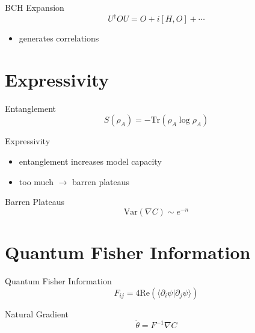 \documentclass{beamer}
\begin{document}

\begin{frame}{BCH Expansion}
\[
U^\dagger O U = O + i[H,O] + \cdots
\]

\begin{itemize}
\item generates correlations
\end{itemize}
\end{frame}

\section{Expressivity}

\begin{frame}{Entanglement}
\[
S(\rho_A) = -\mathrm{Tr}(\rho_A \log \rho_A)
\]
\end{frame}


\begin{frame}{Expressivity}
\begin{itemize}
\item entanglement increases model capacity
\item too much $\rightarrow$ barren plateaus
\end{itemize}
\end{frame}


\begin{frame}{Barren Plateaus}
\[
\mathrm{Var}(\nabla C) \sim e^{-n}
\]
\end{frame}

\section{Quantum Fisher Information}

\begin{frame}{Quantum Fisher Information}
\[
F_{ij} = 4\mathrm{Re}(\langle \partial_i \psi | \partial_j \psi\rangle)
\]
\end{frame}


\begin{frame}{Natural Gradient}
\[
\dot{\theta} = F^{-1}\nabla C
\]
\end{frame}
\end{document}

